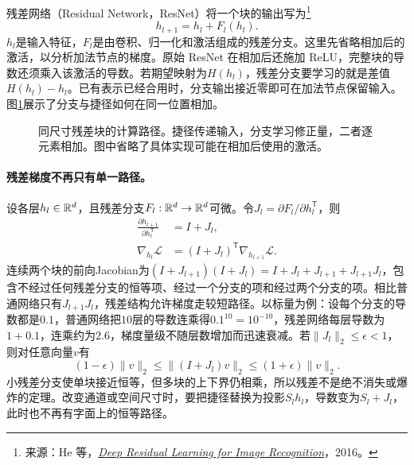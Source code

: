 残差网络（Residual Network，ResNet）将一个块的输出写为\footnote{来源：He 等，\href{https://arxiv.org/abs/1512.03385}{\textit{Deep Residual Learning for Image Recognition}}，2016。}
\begin{equation}
 h_{l+1}=h_l+F_l(h_l).
 \label{eq:vision-residual}
\end{equation}
$h_l$是输入特征，$F_l$是由卷积、归一化和激活组成的残差分支。这里先省略相加后的激活，以分析加法节点的梯度。原始 ResNet 在相加后还施加 ReLU，完整块的导数还须乘入该激活的导数。若期望映射为$H(h_l)$，残差分支要学习的就是差值$H(h_l)-h_l$。已有表示已经合用时，分支输出接近零即可在加法节点保留输入。图\ref{fig:vision-residual-block}展示了分支与捷径如何在同一位置相加。

\begin{figure}[htbp]
\centering
{}
\caption{同尺寸残差块的计算路径。捷径传递输入，分支学习修正量，二者逐元素相加。图中省略了具体实现可能在相加后使用的激活。}
\label{fig:vision-residual-block}
\end{figure}

\paragraph{残差梯度不再只有单一路径。}
设各层$h_l\in\mathbb{R}^d$，且残差分支$F_l:\mathbb{R}^d\to\mathbb{R}^d$可微。令$J_l=\partial F_l/\partial h_l^{\mathsf T}$，则
\begin{align}
 \frac{\partial h_{l+1}}{\partial h_l^{\mathsf T}}&=I+J_l,\\
 \nabla_{h_l}\mathcal L&=(I+J_l)^{\mathsf T}\nabla_{h_{l+1}}\mathcal L.
\end{align}
连续两个块的前向Jacobian为$(I+J_{l+1})(I+J_l)=I+J_l+J_{l+1}+J_{l+1}J_l$，包含不经过任何残差分支的恒等项、经过一个分支的项和经过两个分支的项。相比普通网络只有$J_{l+1}J_l$，残差结构允许梯度走较短路径。以标量为例：设每个分支的导数都是$0.1$，普通网络把$10$层的导数连乘得$0.1^{10}=10^{-10}$，残差网络每层导数为$1+0.1$，连乘约为$2.6$，梯度量级不随层数增加而迅速衰减。若$\|J_l\|_2\leq\epsilon<1$，则对任意向量$v$有
\begin{equation}
 (1-\epsilon)\|v\|_2\leq\|(I+J_l)v\|_2\leq(1+\epsilon)\|v\|_2.
\end{equation}
小残差分支使单块接近恒等，但多块的上下界仍相乘，所以残差不是绝不消失或爆炸的定理。改变通道或空间尺寸时，要把捷径替换为投影$S_lh_l$，导数变为$S_l+J_l$，此时也不再有字面上的恒等路径。

